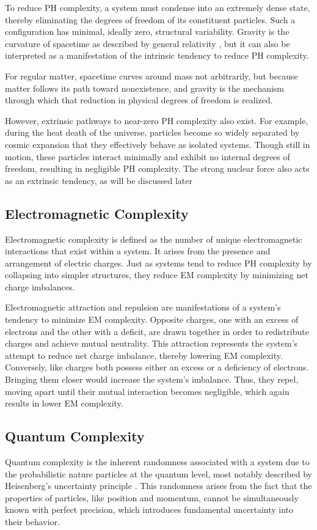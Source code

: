 \documentclass{article}
\begin{document}
To reduce PH complexity, a system must condense into an extremely dense state, thereby eliminating the degrees of freedom of its constituent particles. Such a configuration has minimal, ideally zero, structural variability. Gravity is the curvature of spacetime as described by general relativity \cite{einstein1915}, but it can also be interpreted as a manifestation of the intrinsic tendency to reduce PH complexity. 

For regular matter, spacetime curves around mass not arbitrarily, but because matter follows its path toward nonexistence, and gravity is the mechanism through which that reduction in physical degrees of freedom is realized.

However, extrinsic pathways to near-zero PH complexity also exist. For example, during the heat death of the universe, particles become so widely separated by cosmic expansion that they effectively behave as isolated systems. Though still in motion, these particles interact minimally and exhibit no internal degrees of freedom, resulting in negligible PH complexity. The strong nuclear force also acts as an extrinsic tendency, as will be discussed later

\subsection{Electromagnetic Complexity}
Electromagnetic complexity is defined as the number of unique electromagnetic interactions that exist within a system. It arises from the presence and arrangement of electric charges. Just as systems tend to reduce PH complexity by collapsing into simpler structures, they reduce EM complexity by minimizing net charge imbalances.

Electromagnetic attraction and repulsion are manifestations of a system's tendency to minimize EM complexity. Opposite charges, one with an excess of electrons and the other with a deficit, are drawn together in order to redistribute charges and achieve mutual neutrality. This attraction represents the system's attempt to reduce net charge imbalance, thereby lowering EM complexity. Conversely, like charges both possess either an excess or a deficiency of electrons. Bringing them closer would increase the system's imbalance. Thus, they repel, moving apart until their mutual interaction becomes negligible, which again results in lower EM complexity.

\subsection{Quantum Complexity}
Quantum complexity is the inherent randomness associated with a system due to the probabilistic nature particles at the quantum level, most notably described by Heisenberg’s uncertainty principle \cite{heisenberg1927}. This randomness arises from the fact that the properties of particles, like position and momentum, cannot be simultaneously known with perfect precision, which introduces fundamental uncertainty into their behavior.
\end{document}
